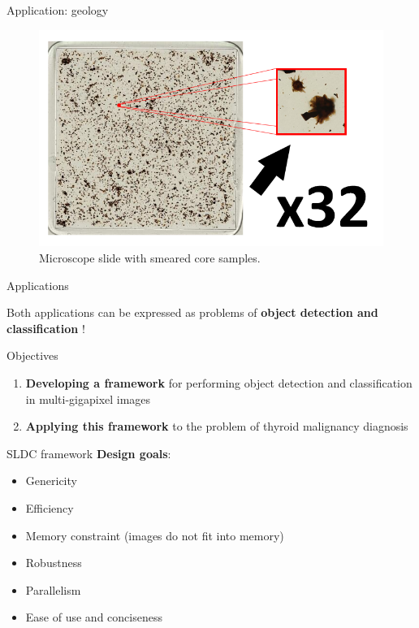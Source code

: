 \documentclass{beamer}
\begin{document}
\begin{frame}{Application: geology}
	\begin{figure}
		\includegraphics[scale=0.8]{images/whole-slide-geo-2.png}
		\caption{Microscope slide with smeared core samples.}
	\end{figure}
\end{frame}


\begin{frame}{Applications}
	\begin{center}
		\Large
		Both applications can be expressed as problems of \textbf{object detection and classification} !
	\end{center}	
\end{frame}

\begin{frame}{Objectives}

	\begin{enumerate}
		\item \textbf{Developing a framework} for performing object detection and classification in multi-gigapixel images
		\vspace{1cm}
		\item \textbf{Applying this framework} to the problem of thyroid malignancy diagnosis
	\end{enumerate}

\end{frame}


\begin{frame}{SLDC framework}
	\textbf{Design goals}:
	\begin{itemize}
		\item Genericity
		\item Efficiency
		\item Memory constraint (images do not fit into memory)
		\item Robustness
		\item Parallelism
		\item Ease of use and conciseness
	\end{itemize}
\end{frame}
\end{document}

